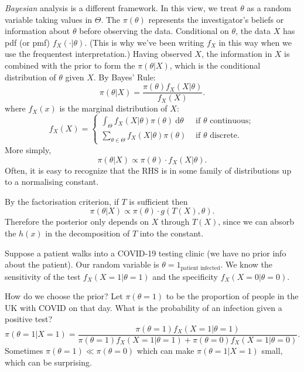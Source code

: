 \documentclass[egregdoesnotlikesansseriftitles,a4paper]{scrartcl}
\begin{document}
\emph{Bayesian} analysis is a different framework. In this view, we treat $\theta $ as a random variable taking values in $\Theta $. The  $\pi \left(\theta \right)$ represents the investigator's beliefs or information about $\theta $ before observing the data. Conditional on $\theta $, the data $X$ has pdf (or pmf) $f_{X}\left( \cdot |\theta \right)$. (This is why we've been writing $f_{X}$ in this way when we use the frequentest interpretation.) Having observed $X$, the information in $X$ is combined with the prior to form the  $\pi \left(\theta |X\right)$, which is the conditional distribution of $\theta $ given $X$. By Bayes' Rule: \[
\pi  \left(\theta |X\right)= \frac{\pi  \left(\theta \right)f_{X}\left(X|\theta \right)}{f_{X}\left(X\right)}
.\] where $f_{X}\left(x\right)$ is the marginal distribution of $X$: \[
f_{X}\left(X\right)=\begin{cases}
     \int_{\Theta  }^{}f_{X}\left(X|\theta \right)\pi \left(\theta \right)  \ \mathrm{d}\theta   &\text{ if } \theta \text{ continuous}  ;\\
     \sum_{\theta \in \Theta }^{}f_{X}\left(X|\theta \right)\pi  \left(\theta \right) &\text{ if } \theta \text{ discrete} .
\end{cases}
\] More simply, \[
\pi  \left(\theta |X\right) \propto \pi \left(\theta \right) \cdot f_{X}\left(X|\theta \right)
.\] Often, it is easy to recognize that the RHS is in some family of distributions up to a normalising constant.
\begin{remark}
     By the factorisation criterion, if $T$ is sufficient then \[
          \pi  \left(\theta |X\right) \propto \pi \left(\theta \right) \cdot g \left(T \left(X\right),\theta \right)
     .\] Therefore the posterior only depends on $X$ through $T \left(X\right)$, since we can absorb the $h \left(x\right)$ in the decomposition of $T$ into the constant.
\end{remark}
\begin{example*}
     Suppose a patient walks into a COVID-19 testing clinic (we have no prior info about the patient). Our random variable is $\theta = 1_{\text{patient infected}}$. We know the sensitivity of the test $f_{X}\left(X=1|\theta =1\right)$ and the specificity $f_{X}\left(X=0|\theta =0\right)$. 
     
     How do we choose the prior? Let $\pi  \left(\theta =1\right)$ to be the proportion of people in the UK with COVID on that day. What is the probability of an infection given a positive test? \[
     \pi \left(\theta =1 |X=1\right)= \frac{\pi  \left(\theta =1\right)f_{X}\left(X=1|\theta =1\right)}{\pi \left(\theta =1\right)f_{X}\left(X=1|\theta =1\right)+\pi \left(\theta =0\right)f_{X}\left(X=1|\theta =0\right)}
     .\] Sometimes $\pi \left(\theta =1\right)\ll \pi \left(\theta =0\right)$ which can make $\pi \left(\theta =1| X=1\right)$ small, which can be surprising. 
\end{example*}
\end{document}
